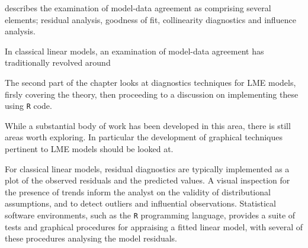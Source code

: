 \documentclass[12pt, a4paper]{report}
\theoremstyle{plain}
\theoremstyle{definition}
\theoremstyle{remark}
\begin{document}
			\citet{schabenberger} describes the examination of model-data agreement as comprising several elements; residual analysis, goodness of fit, collinearity diagnostics and influence analysis.
			
			
			In classical linear models, an examination of model-data agreement has traditionally revolved around
			
			The second part of the chapter looks at diagnostics techniques for LME models, firsly covering the theory, then proceeding to a discussion on 
			implementing these using \texttt{R} code.
			
			While a substantial body of work has been developed in this area, there is still areas worth exploring. 
			In particular the development of graphical techniques pertinent to LME models should be looked at.
			
	
			
	
		
		For classical linear models, residual diagnostics are typically implemented as a plot of the observed residuals and the predicted values. A visual inspection for the presence of trends inform the analyst on the validity of distributional assumptions, and to detect outliers and influential observations. Statistical software environments, such as the \texttt{R} programming language, provides a suite of tests and graphical procedures for appraising a fitted linear model, with several 
		of these procedures analysing the model residuals.
		
	
	
	
	
	
\end{document}
